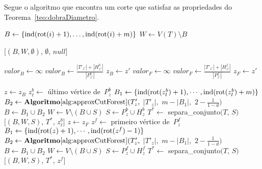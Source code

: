 		Segue o algoritmo que encontra um corte que satisfaz as propriedades do
		Teorema~\ref{teo:dobraDiametro}.

		\bigskip

	\begin{algorithm}[H]
	\label{alg:dobraDiametro}

		\caption{}
		{
			{
				$B\gets \{\mathrm{ind}(\mathrm{rot}(i)+1),\ldots, \mathrm{ind}(\mathrm{rot}(i)+m)\}$\;
				$W\gets V(T)\setminus B$\;

				\Return $[(B,W,\emptyset)$, $\emptyset$, $null]$\;
			}
		}
		$valor_B \gets \infty$\;
		{
			{
			 	$valor_B \gets \frac{|T'_{z'}|+|H_{z'}^b|}{|P^b_{z'}|}$\;
			 	$z_B \gets z'$\; 
			}
		}
		$valor_F \gets \infty$\;
		{
			{
			 	$valor_F \gets \frac{|T'_{z'}|+|H_{z'}^f|}{|P^f_{z'}|}$\;
			 	$z_F \gets z'$\; 
			}
		}
	\end{algorithm}	

	\LinesNumberedHidden
	\begin{algorithm}[H]
	\Numberline
		{
			\Numberline$z\gets z_B$\;
			\Numberline$z^b_\ell \gets$ último vértice de~$P_z^b$\;
			\Numberline$B_1 \gets \{\mathrm{ind}(\mathrm{rot}(z^b_l)+1),\cdots, \mathrm{ind}(\mathrm{rot}(z^b_l)+m)\}$\;
			\Numberline$B_2 \gets \mathbf {Algoritmo\ref{alg:approxCutForest}}(T'_z,$ $|T'_z|,$ $m-|B_1|,$ $2-\frac{1}{1-d})$\;
			\Numberline$B \gets B_1\cup B_2$\;
			\Numberline$W \gets V\setminus (B\cup S)$\; 
			\Numberline$S \gets P_z^b\cup H^b_z$\;
			\Numberline$T^*\gets $ {\sc separa\_conjunto}$(T$, $S)$\;
			\Numberline\Return $[(B,W,S)$, $T^*$, $z^b_\ell]$\;
		}
		\Numberline
		\Else
		{
			\Numberline$z\gets z_F$\;
			\Numberline$z^f \gets $ primeiro vértice de~$P_z^f$\;
			\Numberline$B_1 \gets \{\mathrm{ind}(\mathrm{rot}(z)+1),\cdots, \mathrm{ind}(\mathrm{rot}(z^f)-1)\}$\;
			\Numberline$B_2 \gets \mathbf {Algoritmo\ref{alg:approxCutForest}}(T'_z,$ $|T'_z|,$ $m-|B_1|,$ $2-\frac{1}{1-d})$\;
			\Numberline$B \gets B_1\cup B_2$\;
			\Numberline$W \gets V\setminus (B\cup S)$\; 
			\Numberline$S \gets P_z^f\cup H^f_z $\;
			\Numberline$T^*\gets $ {\sc separa\_conjunto}$(T$, $S)$\;
			\Numberline\Return $[(B,W,S)$, $T^*$, $z^f]$\;		
		}
	\end{algorithm}	
	\LinesNumbered
	\bigskip
	\bigskip
